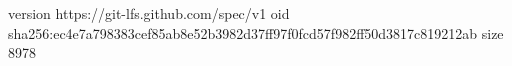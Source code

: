 version https://git-lfs.github.com/spec/v1
oid sha256:ec4e7a798383cef85ab8e52b3982d37ff97f0fcd57f982ff50d3817c819212ab
size 8978
